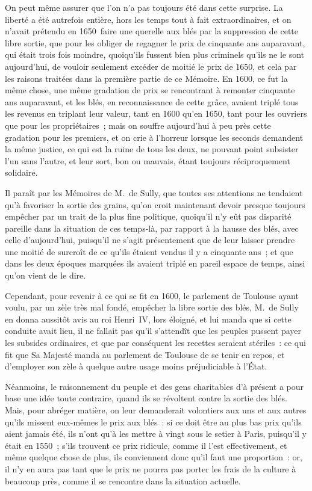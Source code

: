\documentclass[french,twoside]{book} %
\begin{document}
On peut même assurer que l’on n’a pas toujours été dans cette surprise. La liberté a été autrefois entière, hors les temps tout à fait extraordinaires, et on n’avait prétendu en 1650 faire une querelle aux blés par la suppression de cette libre sortie, que pour les obliger de regagner le prix de cinquante ans auparavant, qui était trois fois moindre, quoiqu’ils fussent bien plus criminels qu’ils ne le sont aujourd’hui, de vouloir seulement excéder de moitié le prix de 1650, et cela par les raisons traitées dans la première partie de ce Mémoire. En 1600, ce fut la même chose, une même gradation de prix se rencontrant à remonter cinquante ans auparavant, et les blés, en reconnaissance de cette grâce, avaient triplé tous les revenus en triplant leur valeur, tant en 1600 qu’en 1650, tant pour les ouvriers que pour les propriétaires ; mais on souffre aujourd’hui à peu près cette gradation pour les premiers, et on crie à l’horreur lorsque les seconds demandent la même justice, ce qui est la ruine de tous les deux, ne pouvant point subsister l’un sans l’autre, et leur sort, bon ou mauvais, étant toujours réciproquement solidaire.\par
Il paraît par les Mémoires de M. de Sully, que toutes ses attentions ne tendaient qu’à favoriser la sortie des grains, qu’on croit maintenant devoir presque toujours empêcher par un trait de la plus fine politique, quoiqu’il n’y eût pas disparité pareille dans la situation de ces temps-là, par rapport à la hausse des blés, avec celle d’aujourd’hui, puisqu’il ne s’agit présentement que de leur laisser prendre une moitié de surcroît de ce qu’ils étaient vendus il y a cinquante ans ; et que dans les deux époques marquées ils avaient triplé en pareil espace de temps, ainsi qu’on vient de le dire.\par
Cependant, pour revenir à ce qui se fit en 1600, le parlement de Toulouse ayant voulu, par un zèle très mal fondé, empêcher la libre sortie des blés, M. de Sully en donna aussitôt avis au roi Henri IV, lors éloigné, et lui manda que si cette conduite avait lieu, il ne fallait pas qu’il s’attendît que les peuples pussent payer les subsides ordinaires, et que par conséquent les recettes seraient stériles : ce qui fit que Sa Majesté manda au parlement de Toulouse de se tenir en repos, et d’employer son zèle à quelque autre usage moins préjudiciable à l’État.\par
Néanmoins, le raisonnement du peuple et des gens charitables d’à présent a pour base une idée toute contraire, quand ils se révoltent contre la sortie des blés. Mais, pour abréger matière, on leur demanderait volontiers aux uns et aux autres qu’ils missent eux-mêmes le prix aux blés : si ce doit être au plus bas prix qu’ils aient jamais été, ils n’ont qu’à les mettre à vingt sous le setier à Paris, puisqu’il y était en 1550 ; s’ils trouvent ce prix ridicule, comme il l’est effectivement, et même quelque chose de plus, ils conviennent donc qu’il faut une proportion : or, il n’y en aura pas tant que le prix ne pourra pas porter les frais de la culture à beaucoup près, comme il se rencontre dans la situation actuelle.\par
\end{document}
